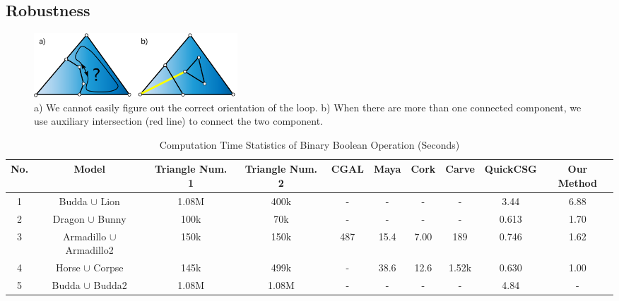 \documentclass[10pt,journal,compsoc]{IEEEtran}
\begin{document}
\subsection{Robustness}



\begin{figure}[t]
\centering
\includegraphics[width=3in]{dual}
\caption{a) We cannot easily figure out the correct orientation of the loop. b) When there are more than one connected component, we use auxiliary intersection (red line) to connect the two component. }
\label{fig:dual}
\end{figure}


\begin{table}[ht]
\caption{Computation Time Statistics of Binary Boolean Operation (Seconds)}
\label{tab:performance}
\centering
\begin{tabular}{*{9}{c|}c}%
\hline
{No.} & {Model} & {Triangle Num. 1} & {Triangle Num. 2} &
CGAL & Maya & Cork & Carve & QuickCSG & Our Method
\\
\hline\hline
1 & Budda $\cup$ Lion & 1.08M & 400k & - & - & - & - & 3.44 & 6.88\\
2 & Dragon $\cup$ Bunny & 100k & 70k & - & - & - & - & 0.613 &1.70 \\
3 & Armadillo $\cup$ Armadillo2 & 150k & 150k & 487 & 15.4 & 7.00 & 189 & 0.746 & 1.62\\
4 & Horse $\cup$ Corpse & 145k & 499k & - & 38.6 & 12.6 & 1.52k & 0.630 & 1.00 \\
5 & Budda $\cup$ Budda2 & 1.08M & 1.08M & - & - & - & - & 4.84 & -\\
\hline
\end{tabular}
\begin{flushleft}

\end{flushleft}
\end{table}
\end{document}
